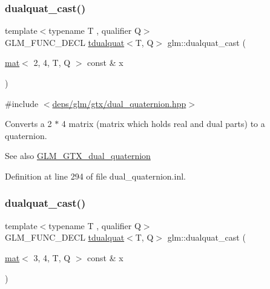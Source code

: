 \mbox{\label{group__gtx__dual__quaternion_gac4064ff813759740201765350eac4236}} 
\subsubsection{\texorpdfstring{dualquat\+\_\+cast()}{dualquat\_cast()}\hspace{0.1cm}{\footnotesize\ttfamily [1/2]}}
{\footnotesize\ttfamily template$<$typename T , qualifier Q$>$ \\
G\+L\+M\+\_\+\+F\+U\+N\+C\+\_\+\+D\+E\+CL \hyperlink{structglm_1_1tdualquat}{tdualquat}$<$T, Q$>$ glm\+::dualquat\+\_\+cast (\begin{DoxyParamCaption}\item[{\hyperlink{structglm_1_1mat}{mat}$<$ 2, 4, T, Q $>$ const \&}]{x }\end{DoxyParamCaption})}



{\ttfamily \#include $<$\hyperlink{dual__quaternion_8hpp}{deps/glm/gtx/dual\+\_\+quaternion.\+hpp}$>$}

Converts a 2 $\ast$ 4 matrix (matrix which holds real and dual parts) to a quaternion.

\begin{DoxySeeAlso}{See also}
\hyperlink{group__gtx__dual__quaternion}{G\+L\+M\+\_\+\+G\+T\+X\+\_\+dual\+\_\+quaternion} 
\end{DoxySeeAlso}


Definition at line 294 of file dual\+\_\+quaternion.\+inl.

\mbox{\label{group__gtx__dual__quaternion_ga91025ebdca0f4ea54da08497b00e8c84}} 
\subsubsection{\texorpdfstring{dualquat\+\_\+cast()}{dualquat\_cast()}\hspace{0.1cm}{\footnotesize\ttfamily [2/2]}}
{\footnotesize\ttfamily template$<$typename T , qualifier Q$>$ \\
G\+L\+M\+\_\+\+F\+U\+N\+C\+\_\+\+D\+E\+CL \hyperlink{structglm_1_1tdualquat}{tdualquat}$<$T, Q$>$ glm\+::dualquat\+\_\+cast (\begin{DoxyParamCaption}\item[{\hyperlink{structglm_1_1mat}{mat}$<$ 3, 4, T, Q $>$ const \&}]{x }\end{DoxyParamCaption})}



